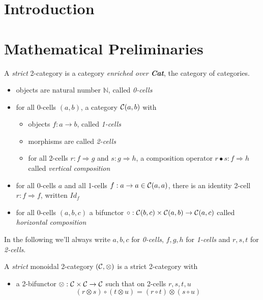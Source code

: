 \documentclass[a4paper]{article}
\begin{document}
\maketitle



\section{Introduction}
\label{sec:intro}

\section{Mathematical Preliminaries}
\label{sec:prelim}

\begin{definition}[2-Category]
A \emph{strict} 2-category \catC is a category \emph{enriched over \textbf{Cat}}, the category of categories.

\begin{itemize}
\item objects are natural number $\mathbb{N}$, called \emph{0-cells}
\item for all 0-cells $(a, b)$, a category ${\cal C}(a, b)$ with
\begin{itemize}
\item objects $f: a \to b$, called \emph{1-cells}
\item morphisms are called \emph{2-cells}
\item for all 2-cells $r: f \Rightarrow g$ and $s: g \Rightarrow h$, a composition operator $r \bullet s: f \Rightarrow h$ called \emph{vertical composition}
\end{itemize}
\item for all 0-cells $a$ and all 1-cells $f: a \to a \in {\cal C}(a, a)$, there is an identity 2-cell $r: f \Rightarrow f$, written $Id_f$
\item for all 0-cells $(a, b, c)$ a bifunctor $\circ: {\cal C}(b, c) \times {\cal C}(a, b) \to {\cal C}(a, c)$ called \emph{horizontal composition}
\end{itemize}

In the following we'll always write $a, b, c$ for \emph{0-cells}, $f, g, h$ for \emph{1-cells} and $r, s, t$ for \emph{2-cells}.
\end{definition}

\begin{definition}
A \emph{strict} monoidal 2-category $({\cal C}, \otimes)$ is a strict 2-category with

\begin{itemize}
\item a 2-bifunctor $\otimes: {\cal C} \times {\cal C} \to {\cal C}$ such that on 2-cells $r, s, t, u$
\[
(r \otimes s) \circ (t \otimes u) = (r \circ t) \otimes (s \circ u)
\]
\end{itemize}
\end{definition}
\end{document}

